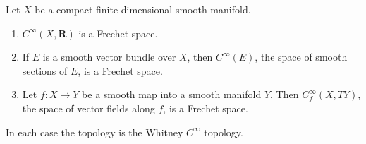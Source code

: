 Let $X$ be a compact finite-dimensional smooth manifold.

\begin{enumerate}
\item[(a)] $C^\infty(X, \mathbf{R})$ is a Frechet space.
\item[(b)] If $E$ is a smooth vector bundle over $X$, then $C^\infty(E)$, the space of smooth sections of $E$, is a Frechet space.
\item[(c)] Let $f: X \to Y$ be a smooth map into a smooth manifold $Y$. Then $C_f^\infty(X, TY)$, the space of vector fields along $f$, is a Frechet space.
\end{enumerate}

In each case the topology is the Whitney $C^\infty$ topology.
